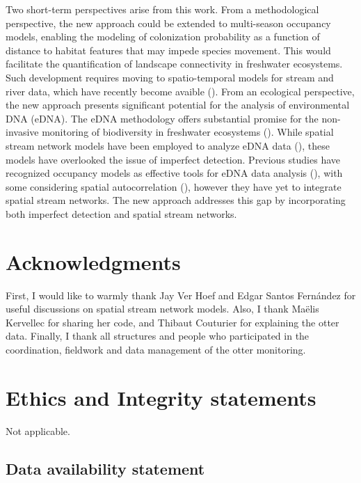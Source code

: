 \documentclass[
  11pt,
  a4paper,
]{article}
\begin{document}
Two short-term perspectives arise from this work. From a methodological perspective, the new approach could be extended to multi-season occupancy models, enabling the modeling of colonization probability as a function of distance to habitat features that may impede species movement. This would facilitate the quantification of landscape connectivity in freshwater ecosystems. Such development requires moving to spatio-temporal models for stream and river data, which have recently become avaible (). From an ecological perspective, the new approach presents significant potential for the analysis of environmental DNA (eDNA). The eDNA methodology offers substantial promise for the non-invasive monitoring of biodiversity in freshwater ecosystems (). While spatial stream network models have been employed to analyze eDNA data (), these models have overlooked the issue of imperfect detection. Previous studies have recognized occupancy models as effective tools for eDNA data analysis (), with some considering spatial autocorrelation (), however they have yet to integrate spatial stream networks. The new approach addresses this gap by incorporating both imperfect detection and spatial stream networks.

\section{Acknowledgments}\label{acknowledgments}

First, I would like to warmly thank Jay Ver Hoef and Edgar Santos Fernández for useful discussions on spatial stream network models. Also, I thank Maëlis Kervellec for sharing her code, and Thibaut Couturier for explaining the otter data. Finally, I thank all structures and people who participated in the coordination, fieldwork and data management of the otter monitoring.

\section{Ethics and Integrity statements}\label{ethics-and-integrity-statements}

Not applicable.

\subsection{Data availability statement}\label{data-availability-statement}
\end{document}
